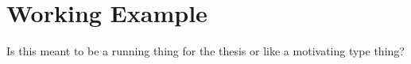 \section{Working Example}
Is this meant to be a running thing for the thesis or like a motivating type thing?
